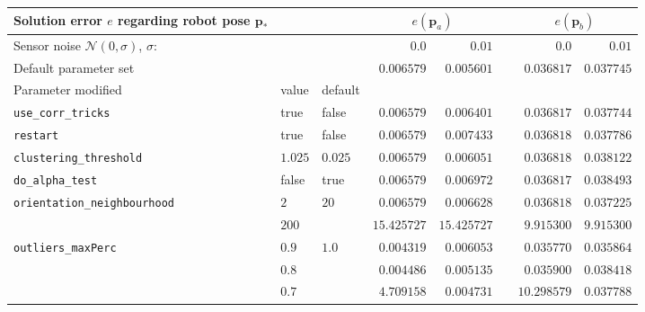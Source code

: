 \begin{table*}\hspace{-1.5cm}
\begin{tabular}{lll|rrr|rr}
  Solution error $e$ regarding robot pose $\bm{p}_{*}$    &  &      & \multicolumn{2}{c}{$e(\bm{p}_a)$} &  & \multicolumn{2}{c}{$e(\bm{p}_b)$} \\ \hline
  Sensor noise $\mathcal{N}(0,\sigma)$, $\sigma$:             & &        & $0.0$                 & $0.01$          &  & $0.0$            & $0.01$         \\ \hline
  Default parameter set               &         &           & $0.006579$        & $0.005601$        &  & $0.036817$         & $0.037745$       \\ \hline
  Parameter modified                  & value   & default   &                   &                   &  &                    &                             \\ \hline
  \texttt{use\_corr\_tricks}          & true    & false     & $0.006579$        & $0.006401$        &  & $0.036817$         & $0.037744$       \\
  \texttt{restart}                    & true    & false     & $0.006579$        & $0.007433$        &  & $0.036818$         & $0.037786$       \\
  \texttt{clustering\_threshold}      & $1.025$ & $0.025$   & $0.006579$        & $0.006051$        &  & $0.036818$         & $0.038122$       \\
  \texttt{do\_alpha\_test}            & false   & true      & $0.006579$        & $0.006972$        &  & $0.036817$         & $0.038493$       \\
  \texttt{orientation\_neighbourhood} & $2$     & $20$      & $0.006579$        & $0.006628$        &  & $0.036818$         & $0.037225$       \\
                                      & $200$   &           & $15.425727$       & $15.425727$       &  & $9.915300$         & $9.915300$         \\
  \texttt{outliers\_maxPerc}          & $0.9$   & $1.0$     & $0.004319$        & $0.006053$        &  & $0.035770$         & $0.035864$       \\
                                      & $0.8$   &           & $0.004486$        & $0.005135$        &  & $0.035900$         & $0.038418$       \\
                                      & $0.7$   &           & $4.709158$        & $0.004731$        &  & $10.298579$        & $0.037788$       \\

\end{tabular}
\end{table*}
